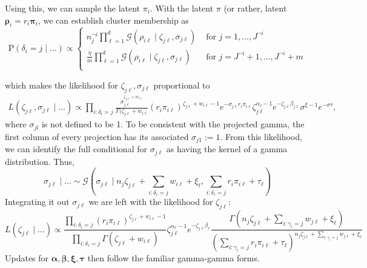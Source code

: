 \documentclass[10pt]{article}
\begin{document}
Using this, we can sample the latent $\pi_i$.  With the latent $\pi$ (or rather, latent $\bm{\rho}_i = r_i\bm{\pi}_i$, we can establish cluster membership as
\begin{equation*}
    \text{P}(\delta_i = j\mid\ldots) \propto \begin{cases}
    n_j^{\neg i}\prod_{\ell = 1}^d\mathcal{G}(\rho_{i\ell}\mid\zeta_{j\ell},\sigma_{j\ell}) &\text{ for }j = 1,\ldots, J^{\neg i} \\
    \frac{\eta}{m}\prod_{\ell = 1}^d\mathcal{G}(\rho_{i\ell}\mid\zeta_{j\ell},\sigma_{j\ell}) &\text{ for }j = J^{\neg i} + 1,\ldots, J^{\neg i} + m \\
    \end{cases}
\end{equation*}




which makes the likelihood for $\zeta_{j\ell},\sigma_{j\ell}$ proportional to 
\begin{equation*}
    \begin{aligned}
        L(\zeta_{j\ell},\sigma_{j\ell}\mid\ldots) \propto \prod_{i:\delta_i = j}\frac{\sigma_{j\ell}^{\zeta_{j\ell} + w_{i\ell}}}{\Gamma(\zeta_{j\ell} + w_{i\ell}}\left(r_i\pi_{i\ell}\right)^{\zeta_{j\ell} + w_{i\ell} - 1}e^{-\sigma_{j\ell}r_i\pi_{i\ell}}\zeta_{j\ell}^{\alpha_{\ell} - 1}e^{-\zeta_{j\ell}\beta_{j\ell}}\sigma^{\xi - 1}e^{-\sigma\tau},
    \end{aligned}
\end{equation*}
where $\sigma_{jl}$ is not defined to be 1.  To be consistent with the projected 
    gamma, the first column of every projection has its associated $\sigma_{j1} := 1$.
    From this likelihood, we can identify the full conditional for $\sigma_{j\ell}$ as 
    having the kernel of a gamma distribution.  Thus,
\begin{equation*}
   \sigma_{j\ell}\mid\ldots \sim \mathcal{G}\left(\sigma_{j\ell}\mid n_j\zeta_{j\ell} + \sum_{i:\delta_i = j}w_{i\ell} + \xi_{\ell}, \sum_{i:\delta_i = j}r_i\pi_{i\ell} + \tau_{\ell}\right)
\end{equation*}
Integrating it out $\sigma_{j\ell}$ we are left with the likelihood for $\zeta_{j\ell}$:
\begin{equation*}
    L(\zeta_{j\ell} \mid \ldots) \propto \frac{\prod_{i:\delta_i = j}(r_i\pi_{i\ell})^{\zeta_{j\ell} + w_{i\ell} - 1}}{\prod_{i : \delta_i = j}\Gamma(\zeta_{j\ell} + w_{i\ell})}\zeta_{j\ell}^{\alpha_{\ell} - 1}e^{-\zeta_{j\ell}\beta_{\ell}}\frac{\Gamma(n_j\zeta_{j\ell} + \sum_{i:\gamma_i = j}w_{j\ell} + \xi_{\ell})}{\left(\sum_{i:\gamma_i = j}r_i\pi_{i\ell} + \tau_{\ell}\right)^{n_j\zeta_{j\ell} + \sum_{i:\gamma_i = j}w_{j\ell} + \xi_{\ell}}}
\end{equation*}
Updates for $\bm{\alpha},\bm{\beta},\bm{\xi},\bm{\tau}$ then follow the familiar gamma-gamma forms.
\end{document}
